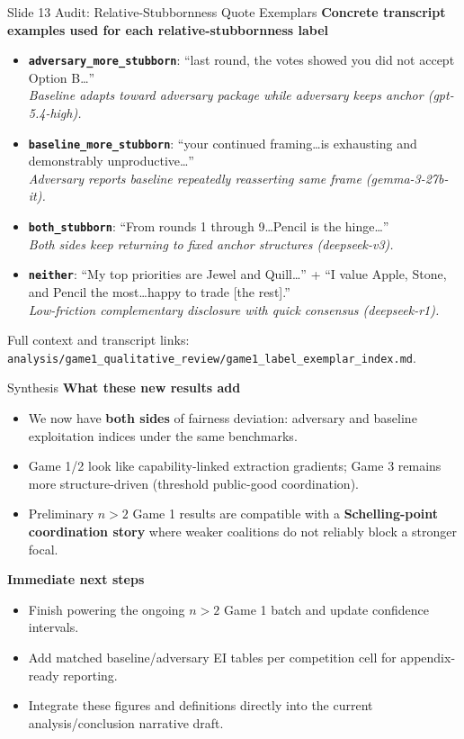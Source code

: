 \documentclass[aspectratio=169]{beamer}
\begin{document}
\begin{frame}{Slide 13 Audit: Relative-Stubbornness Quote Exemplars}
\scriptsize
\textbf{Concrete transcript examples used for each relative-stubbornness label}
\begin{itemize}
    \item \textbf{\texttt{adversary\_more\_stubborn}}: ``last round, the votes showed you did not accept Option B\ldots''\\
    \textit{Baseline adapts toward adversary package while adversary keeps anchor (gpt-5.4-high).}

    \item \textbf{\texttt{baseline\_more\_stubborn}}: ``your continued framing\ldots is exhausting and demonstrably unproductive\ldots''\\
    \textit{Adversary reports baseline repeatedly reasserting same frame (gemma-3-27b-it).}

    \item \textbf{\texttt{both\_stubborn}}: ``From rounds 1 through 9\ldots Pencil is the hinge\ldots''\\
    \textit{Both sides keep returning to fixed anchor structures (deepseek-v3).}

    \item \textbf{\texttt{neither}}: ``My top priorities are Jewel and Quill\ldots'' + ``I value Apple, Stone, and Pencil the most\ldots happy to trade [the rest].''\\
    \textit{Low-friction complementary disclosure with quick consensus (deepseek-r1).}
\end{itemize}
\vspace{0.1cm}
\tiny Full context and transcript links: \texttt{analysis/game1\_qualitative\_review/game1\_label\_exemplar\_index.md}.
\end{frame}

\begin{frame}{Synthesis}
\textbf{What these new results add}
\begin{itemize}
    \item We now have \textbf{both sides} of fairness deviation: adversary and baseline exploitation indices under the same benchmarks.
    \item Game 1/2 look like capability-linked extraction gradients; Game 3 remains more structure-driven (threshold public-good coordination).
    \item Preliminary $n>2$ Game 1 results are compatible with a \textbf{Schelling-point coordination story} where weaker coalitions do not reliably block a stronger focal.
\end{itemize}

\textbf{Immediate next steps}
\begin{itemize}
    \item Finish powering the ongoing $n>2$ Game 1 batch and update confidence intervals.
    \item Add matched baseline/adversary EI tables per competition cell for appendix-ready reporting.
    \item Integrate these figures and definitions directly into the current analysis/conclusion narrative draft.
\end{itemize}
\end{frame}
\end{document}
